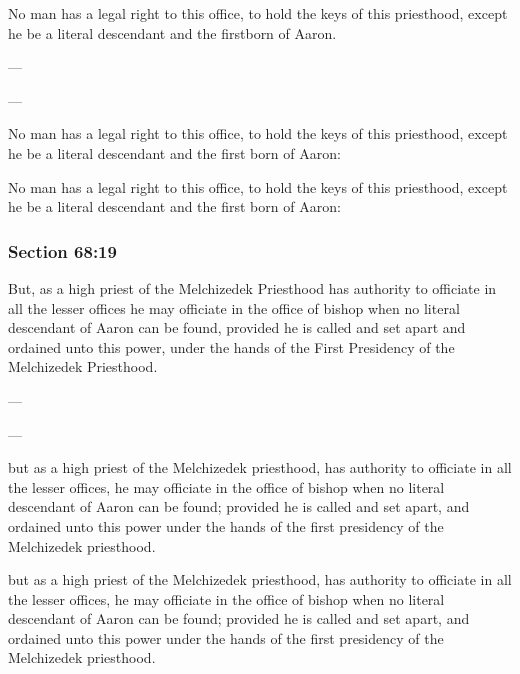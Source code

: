 		No man has a legal right to this office, to hold the keys of this priesthood, except he be a literal descendant and the firstborn of Aaron.

		\begin{framed}
		\scriptsize
			\begin{compactdesc}
				\item[JSP] ---
				\item[EMS] ---
				\item[EMS-R] No man has a legal right to this office, to hold the keys of this priesthood, except he be a literal descendant and the first born of Aaron:
				\item[DC 1835] No man has a legal right to this office, to hold the keys of this priesthood, except he be a literal descendant and the first born of Aaron:
			\end{compactdesc}
		\end{framed}

	\subsubsection{Section 68:19} %
		\label{DC68-19}

		But, as a high priest of the Melchizedek Priesthood has authority to officiate in all the lesser offices he may officiate in the office of bishop when no literal descendant of Aaron can be found, provided he is called and set apart and ordained unto this power, under the hands of the First Presidency of the Melchizedek Priesthood.

		\begin{framed}
		\scriptsize
			\begin{compactdesc}
				\item[JSP] ---
				\item[EMS] ---
				\item[EMS-R] but as a high priest of the Melchizedek priesthood, has authority to officiate in all the lesser offices, he may officiate in the office of bishop when no literal descendant of Aaron can be found; provided he is called and set apart, and ordained unto this power under the hands of the first presidency of the Melchizedek priesthood.
				\item[DC 1835] but as a high priest of the Melchizedek priesthood, has authority to officiate in all the lesser offices, he may officiate in the office of bishop when no literal descendant of Aaron can be found; provided he is called and set apart, and ordained unto this power under the hands of the first presidency of the Melchizedek priesthood.
			\end{compactdesc}
		\end{framed}

